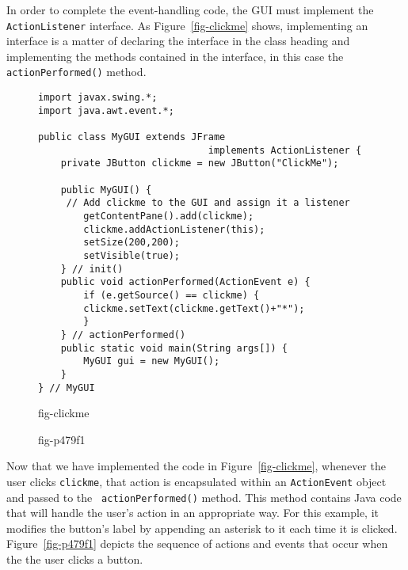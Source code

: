 \pagebreak
In order to complete the event-handling code, the GUI must implement
the {\tt ActionListener} interface.  As Figure~\ref{fig-clickme}
shows, implementing an interface is a matter of declaring the
interface in the class heading and implementing the methods contained
in the interface, in this case the {\tt actionPerformed()} method.

\begin{figure}[h]
\jjjprogstart
\begin{jjjlisting}
\begin{lstlisting}
import javax.swing.*;
import java.awt.event.*;

public class MyGUI extends JFrame 
                              implements ActionListener {
    private JButton clickme = new JButton("ClickMe");

    public MyGUI() {
     // Add clickme to the GUI and assign it a listener
        getContentPane().add(clickme);   
        clickme.addActionListener(this);
        setSize(200,200);
        setVisible(true);
    } // init()
    public void actionPerformed(ActionEvent e) {
        if (e.getSource() == clickme) {
	    clickme.setText(clickme.getText()+"*");
        }
    } // actionPerformed()
    public static void main(String args[]) {
        MyGUI gui = new MyGUI();
    }
} // MyGUI
\end{lstlisting}
\end{jjjlisting}
{fig-clickme}
\end{figure}

\begin{figure}[tb]
 {fig-p479f1}

\end{figure}

Now that we have implemented the code in Figure~\ref{fig-clickme},
whenever the user clicks {\tt clickme}, that action is encapsulated
within an {\tt ActionEvent} object and passed to the {\tt
actionPerformed()} method.  This method contains Java code that will
handle the user's action in an appropriate way.  For this example, it
modifies the button's label by appending an asterisk to it each time
it is clicked.  Figure~\ref{fig-p479f1} depicts the
sequence of actions and events that occur when the the user 
clicks a button.

